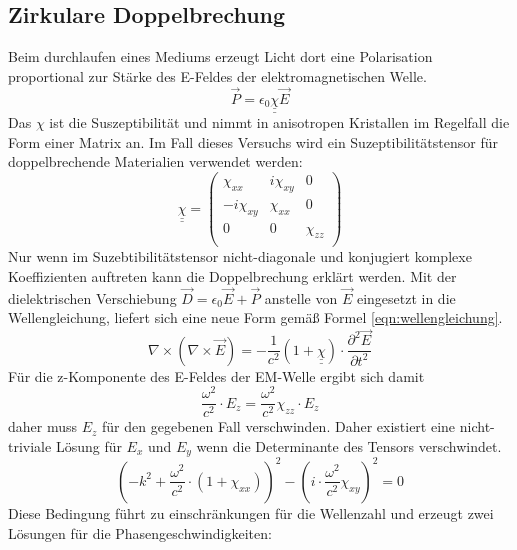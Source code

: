 \subsection{Zirkulare Doppelbrechung}
Beim durchlaufen eines Mediums erzeugt Licht dort eine Polarisation proportional zur Stärke des E-Feldes der elektromagnetischen Welle.
\begin{equation}
    \vec{P} = \epsilon_0 \underline{\underline{\chi}} \vec{E}
\end{equation}
Das $\chi$ ist die Suszeptibilität und nimmt in anisotropen Kristallen im Regelfall die Form einer Matrix an.
Im Fall dieses Versuchs wird ein Suzeptibilitätstensor für doppelbrechende Materialien verwendet werden:
\begin{equation}
    \underline{\underline{\chi}} = 
    \begin{pmatrix}
        \chi_{xx} & i \chi_{xy} & 0\\
        -i \chi_{xy} & \chi_{xx} & 0\\ 
        0 & 0 & \chi_{zz}\\
    \end{pmatrix}
    \label{eqn:Suszept}
\end{equation}
Nur wenn im Suzebtibilitätstensor nicht-diagonale und konjugiert komplexe Koeffizienten auftreten kann die Doppelbrechung erklärt werden.
Mit der dielektrischen Verschiebung $\vec{D} = \epsilon_0 \vec{E} + \vec{P} $ anstelle von $\vec{E}$ eingesetzt in die Wellengleichung, liefert sich eine neue Form gemäß Formel \ref{eqn:wellengleichung}.
\begin{equation}
    \nabla \times \left( \nabla \times \vec{E} \right) = -\frac{1}{c^2} \left( 1 + \underline{\underline{\chi}} \right) \cdot \frac{\partial^2 \vec{E}}{\partial t^2}
    \label{eqn:wellengleichung}
\end{equation}
Für die z-Komponente des E-Feldes der EM-Welle ergibt sich damit
\begin{equation}
    \frac{\omega^2}{c^2} \cdot E_z = \frac{\omega^2}{c^2} \chi_{zz} \cdot E_z
\end{equation}
daher muss $E_{z}$ für den gegebenen Fall verschwinden.
Daher existiert eine nicht-triviale Lösung für $E_x$ und $E_y$ wenn die Determinante des Tensors verschwindet.
\begin{equation}
    \left( -k^2 + \frac{\omega^2}{c^2}\cdot \left( 1 + \chi_{xx} \right) \right)^2 - \left( i \cdot \frac{\omega^2}{c^2} \chi_{xy} \right)^2 = 0
\end{equation}
Diese Bedingung führt zu einschränkungen für die Wellenzahl und erzeugt zwei Lösungen für die Phasengeschwindigkeiten:
